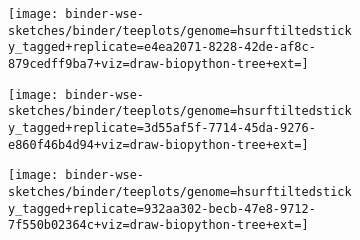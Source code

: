 \begin{figure}

\begin{subfigure}[c]{\linewidth} \centering
\begin{minipage}[c]{0.08\linewidth} \flushright
    \caption{}
    \label{fig:tagged_25}
  \end{minipage}%
  \begin{minipage}[c]{0.92\linewidth}
    \texttt{[image: binder-wse-sketches/binder/teeplots/genome=hsurftiltedsticky\_tagged+replicate=e4ea2071-8228-42de-af8c-879cedff9ba7+viz=draw-biopython-tree+ext=]}
  \end{minipage}%
\end{subfigure}

\vspace{-1ex}

\begin{subfigure}[c]{\linewidth} \centering
\begin{minipage}[c]{0.08\linewidth} \flushright
    \caption{}
    \label{fig:tagged_50}
  \end{minipage}%
  \begin{minipage}[c]{0.92\linewidth}
    \texttt{[image: binder-wse-sketches/binder/teeplots/genome=hsurftiltedsticky\_tagged+replicate=3d55af5f-7714-45da-9276-e860f46b4d94+viz=draw-biopython-tree+ext=]}
  \end{minipage}%
\end{subfigure}

\vspace{-1ex}

\begin{subfigure}[c]{\linewidth} \centering
  \begin{minipage}[c]{0.08\linewidth} \flushright
    \caption{}
    \label{fig:tagged_100}
  \end{minipage}%
  \begin{minipage}[c]{0.92\linewidth}
    \texttt{[image: binder-wse-sketches/binder/teeplots/genome=hsurftiltedsticky\_tagged+replicate=932aa302-becb-47e8-9712-7f550b02364c+viz=draw-biopython-tree+ext=]}
  \end{minipage}%
\end{subfigure}

\vspace{-1ex}


\end{figure}
